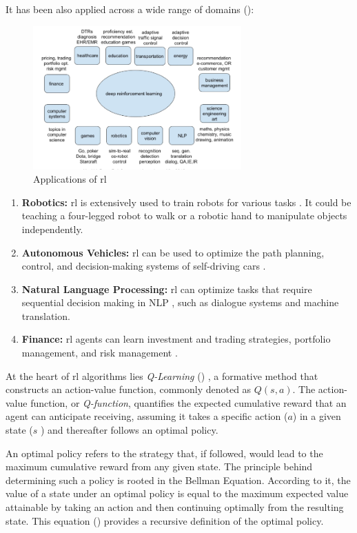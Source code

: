 \documentclass[12pt,a4paper,openright,twoside]{book}
\begin{document}
It has been also applied across a wide range of domains ():
\begin{figure}
    \centering
    \includegraphics[width=8cm]{img/applicationsofrl.png}
    \caption{Applications of \ac{rl}}
    \label{fig:y}
\end{figure}
\begin{enumerate}
    \item \textbf{Robotics:} \ac{rl} is extensively used to train robots for various tasks \cite{robotics2030122}. It could be teaching a four-legged robot to walk or a robotic hand to manipulate objects independently.
    \item \textbf{Autonomous Vehicles:} \ac{rl} can be used to optimize the path planning, control, and decision-making systems of self-driving cars \cite{MARTINEZDIAZ2018275}.
    \item \textbf{Natural Language Processing:} \ac{rl} can optimize tasks that require sequential decision making in NLP \cite{nlp-rl}, such as dialogue systems and machine translation.
    \item \textbf{Finance:} \ac{rl} agents can learn investment and trading strategies, portfolio management, and risk management \cite{finance-rl}.
\end{enumerate}

At the heart of \ac{rl} algorithms lies \emph{Q-Learning} () \cite{qlearning}, a 
formative method that constructs an action-value function, commonly denoted 
as $Q(s, a)$. The action-value function, or \emph{Q-function}, quantifies the expected 
cumulative reward that an agent can anticipate receiving, assuming it takes a 
specific action ($a$) in a given state ($s$ ) and thereafter follows an optimal policy.

An optimal policy refers to the strategy that, if followed, would lead to the 
maximum cumulative reward from any given state. The principle behind determining 
such a policy is rooted in the Bellman Equation. According to it, the value of a state under an 
optimal policy is equal to the maximum expected value attainable by taking an 
action and then continuing optimally from the resulting state. This equation ()
provides a recursive definition of the optimal policy.
\end{document}
